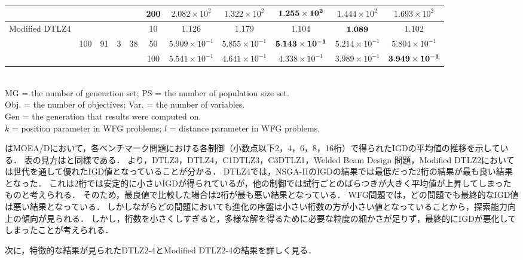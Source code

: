 \documentclass[../main/main]{subfiles}
\begin{document}
\begin{table}[htbp]
\begin{tabular}{c|ccccc|c|c|c|c|c}
				   &        &      &&  &200 &$2.082 \times 10^{2}$ & $1.322 \times 10^{2}$ & $\bf{1.255 \times 10^{2}}$ & $1.444 \times 10^{2}$ & $1.693 \times 10^{2}$\\
\hline
\multirow{3}{*}{\fontsize{6.5pt}{0pt}\selectfont Modified DTLZ4} & &&       &       & 10 &$1.126$ & $1.179$ & $1.104$ & $\bf{1.089}$ & $1.102$\\
  				   & 100 & 91 & 3 & 38 &50 &$5.909 \times 10^{-1}$ & $5.855 \times 10^{-1}$ & $\bf{5.143 \times 10^{-1}}$ & $5.214 \times 10^{-1}$ & $5.804 \times 10^{-1}$\\
				   &        &      &&  &100 &$5.541 \times 10^{-1}$ & $4.641 \times 10^{-1}$ & $4.338 \times 10^{-1}$ & $3.989 \times 10^{-1}$ & $\bf{3.949 \times 10^{-1}}$\\
			   
\hline\end{tabular}
\\
{\footnotesize MG = the number of generation set; PS = the number of population size set.}\\
{\footnotesize Obj. = the number of objectives; Var. = the number of variables.}\\
{\footnotesize Gen = the generation that results were computed on.} \\
{\footnotesize $k$ = position parameter in WFG problems; $l$ = distance parameter in WFG problems.}\\
\end{table}
\afterpage{\clearpage}

はMOEA/Dにおいて，各ベンチマーク問題における各制御（小数点以下2，4，6，8，16桁）で得られたIGDの平均値の推移を示している．
表の見方はと同様である．
より，DTLZ3，DTLZ4，C1DTLZ3，C3DTLZ1，Welded Beam Design 問題，Modified DTLZ2においては世代を通して優れたIGD値となっていることが分かる．
DTLZ4では，NSGA-IIのIGDの結果では最低だった2桁の結果が最も良い結果となった．
これは2桁では安定的に小さいIGDが得られているが，他の制御では試行ごとのばらつきが大きく平均値が上昇してしまったものと考えられる．
そのため，最良値で比較した場合は2桁が最も悪い結果となっている．
WFG問題では，どの問題でも最終的なIGD値は悪い結果となっている．
しかしながらどの問題においても進化の序盤は小さい桁数の方が小さい値となっていることから，探索能力向上の傾向が見られる．
しかし，桁数を小さくしすぎると，多様な解を得るために必要な粒度の細かさが足りず，最終的にIGDが悪化してしまったことが考えられる．

次に，特徴的な結果が見られたDTLZ2-4とModified DTLZ2-4の結果を詳しく見る．
\end{document}
